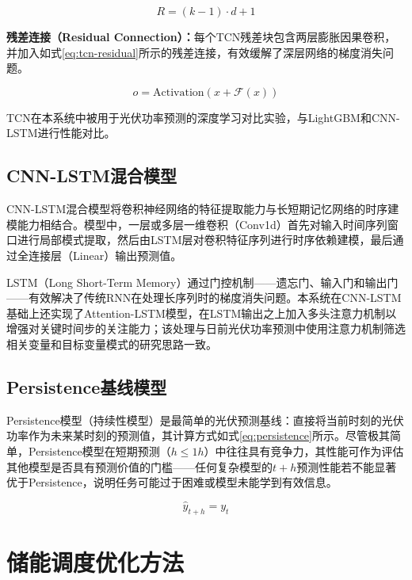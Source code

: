 \documentclass[12pt,a4paper]{ctexbook}
\begin{document}
\begin{equation}
R = (k-1) \cdot d + 1
\label{eq:tcn-receptive-field}
\end{equation}

\textbf{残差连接（Residual Connection）：}每个TCN残差块包含两层膨胀因果卷积，并加入如式\ref{eq:tcn-residual}所示的残差连接，有效缓解了深层网络的梯度消失问题。

\begin{equation}
o = \text{Activation}\left(x + \mathcal{F}(x)\right)
\label{eq:tcn-residual}
\end{equation}

TCN在本系统中被用于光伏功率预测的深度学习对比实验，与LightGBM和CNN-LSTM进行性能对比。

\subsection{CNN-LSTM混合模型}

CNN-LSTM混合模型将卷积神经网络的特征提取能力与长短期记忆网络的时序建模能力相结合\cite{wang-cnn-lstm-2019}。模型中，一层或多层一维卷积（Conv1d）首先对输入时间序列窗口进行局部模式提取，然后由LSTM层对卷积特征序列进行时序依赖建模，最后通过全连接层（Linear）输出预测值。

LSTM（Long Short-Term Memory）通过门控机制——遗忘门、输入门和输出门——有效解决了传统RNN在处理长序列时的梯度消失问题\cite{lstm-pv-2021}。本系统在CNN-LSTM基础上还实现了Attention-LSTM模型，在LSTM输出之上加入多头注意力机制以增强对关键时间步的关注能力；该处理与日前光伏功率预测中使用注意力机制筛选相关变量和目标变量模式的研究思路一致\cite{qu-attention-cnnlstm-2021}。

\subsection{Persistence基线模型}

Persistence模型（持续性模型）是最简单的光伏预测基线：直接将当前时刻的光伏功率作为未来某时刻的预测值，其计算方式如式\ref{eq:persistence}所示。尽管极其简单，Persistence模型在短期预测（$h \le 1h$）中往往具有竞争力，其性能可作为评估其他模型是否具有预测价值的门槛——任何复杂模型的$t+h$预测性能若不能显著优于Persistence，说明任务可能过于困难或模型未能学到有效信息。

\begin{equation}
\hat{y}_{t+h} = y_t
\label{eq:persistence}
\end{equation}

\section{储能调度优化方法}
\end{document}
